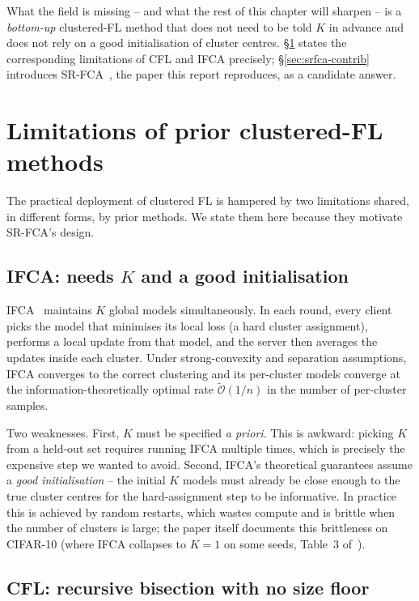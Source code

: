 What the field is missing -- and what the rest of this chapter will sharpen -- is a \emph{bottom-up} clustered-FL method that does not need to be told $K$ in advance and does not rely on a good initialisation of cluster centres. \S\ref{sec:prior-work} states the corresponding limitations of CFL and IFCA precisely; \S\ref{sec:srfca-contrib} introduces SR-FCA~\parencite{vardhan2024srfca}, the paper this report reproduces, as a candidate answer.

\section{Limitations of prior clustered-FL methods}\label{sec:prior-work}

The practical deployment of clustered FL is hampered by two limitations shared, in different forms, by prior methods. We state them here because they motivate SR-FCA's design.

\subsection{IFCA: needs $K$ and a good initialisation}

IFCA~\parencite{ghosh2022ifca} maintains $K$ global models simultaneously. In each round, every client picks the model that minimises its local loss (a hard cluster assignment), performs a local update from that model, and the server then averages the updates inside each cluster. Under strong-convexity and separation assumptions, IFCA converges to the correct clustering and its per-cluster models converge at the information-theoretically optimal rate $\tilde{\mathcal{O}}(1/n)$ in the number of per-cluster samples.

Two weaknesses. First, $K$ must be specified \emph{a priori}. This is awkward: picking $K$ from a held-out set requires running IFCA multiple times, which is precisely the expensive step we wanted to avoid. Second, IFCA's theoretical guarantees assume a \emph{good initialisation} -- the initial $K$ models must already be close enough to the true cluster centres for the hard-assignment step to be informative. In practice this is achieved by random restarts, which wastes compute and is brittle when the number of clusters is large; the paper itself documents this brittleness on CIFAR-10 (where IFCA collapses to $K = 1$ on some seeds, Table~3 of~\parencite{vardhan2024srfca}).

\subsection{CFL: recursive bisection with no size floor}

